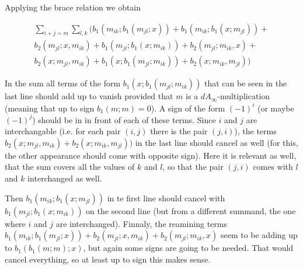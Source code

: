 \documentclass[twoside]{article}
\begin{document}
%

Applying the brace relation we obtain

\begin{align*}
\sum_{i+j=m}\sum_{l,k}(b_1(m_{ik}; b_1(m_{jl};x))+b_1(m_{ik};b_1(x;m_{jl}))+\\
 b_2(m_{jl};x,m_{ik})+b_1(m_{jl};b_1(x;m_{ik}))+b_2(m_{jl};m_{ik},x)+\\
b_2(x;m_{jl},m_{ik})+b_1(x;b_1(m_{jl};m_{ik}))+b_2(x;m_{ik},m_{jl}))
\end{align*}

In the sum all terms of the form $b_1(x;b_1(m_{jl};m_{ik}))$ that can be seen in the last line should add up to vanish provided that $m$ is a $dA_\infty$-multiplication (meaning that up to sign $b_1(m;m)=0$). A sign of the form $(-1)^i$ (or maybe $(-1)^j$) should be in in front of each of these terms. Since $i$ and $j$ are interchangable (i.e. for each pair $(i,j)$ there is the pair $(j,i)$), the terms $b_2(x;m_{jl},m_{ik})+b_2(x;m_{ik},m_{jl}))$ in the last line should cancel as well (for this, the other appearance should come with opposite sign). Here it is relevant as well, that the sum covers all the values of $k$ and $l$, so that the pair $(j,i)$ comes with $l$ and $k$ interchanged as well. 

Then $b_1(m_{ik};b_1(x;m_{jl}))$ in te first line should cancel with $b_1(m_{jl};b_1(x;m_{ik}))$ on the second line (but from a different summand, the one where $i$ and $j$ are interchanged). Finnaly, the reamining terms $b_1(m_{ik}; b_1(m_{jl};x))+b_2(m_{jl};x,m_{ik})+b_2(m_{jl};m_{ik},x)$ seem to be adding up to $b_1(b_1(m;m);x)$, but again some signs are going to be needed. That would cancel everything, so at least up to sign this makes sense.
\end{document}
